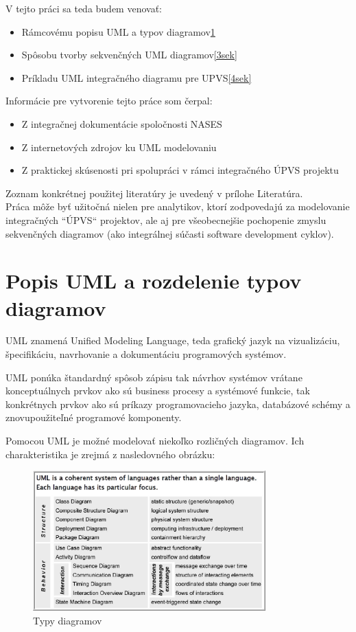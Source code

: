 \documentclass[10pt,twoside,slovak,a4paper]{article}
\begin{document}
V tejto práci sa teda budem venovať:

\begin{itemize}
\item Rámcovému popisu UML a typov diagramov\ref{2sek}
\item Spôsobu tvorby sekvenčných UML diagramov\ref{3sek}
\item Príkladu UML integračného diagramu pre UPVS\ref{4sek}
\end{itemize}

Informácie pre vytvorenie tejto práce som čerpal:

\begin{itemize}
\item Z integračnej dokumentácie spoločnosti NASES
\item Z internetových zdrojov ku UML modelovaniu
\item Z praktickej skúsenosti pri spolupráci v rámci integračného ÚPVS projektu
\end{itemize}
Zoznam konkrétnej použitej literatúry je uvedený v prílohe Literatúra.\\

Práca môže byť užitočná nielen pre analytikov, ktorí zodpovedajú za modelovanie integračných ``ÚPVS“ projektov, ale aj pre všeobecnejšie pochopenie zmyslu sekvenčných diagramov (ako integrálnej súčasti software development cyklov).




\section{Popis UML a rozdelenie typov diagramov} \label{2sek}

UML znamená Unified Modeling Language, teda grafický jazyk na vizualizáciu, špecifikáciu, navrhovanie a dokumentáciu programových systémov. 

UML ponúka štandardný spôsob zápisu tak návrhov systémov vrátane konceptuálnych prvkov ako sú business procesy a systémové funkcie, tak konkrétnych prvkov ako sú príkazy programovacieho jazyka, databázové schémy a znovupoužiteľné programové komponenty.\cite{WIKI}\newpage

Pomocou UML je možné modelovať niekoľko rozličných diagramov. Ich charakteristika je zrejmá z nasledovného obrázku\cite{UMLUni}:


\begin{figure}[h]
\centering
\includegraphics[width=0.8\textwidth]{Images/Obr1.jpg}
\caption{Typy diagramov}
\end{figure}
\end{document}
